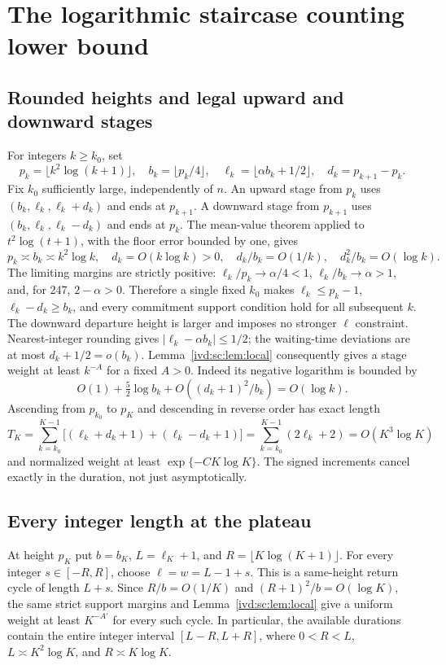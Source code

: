 \documentclass[11pt,letterpaper]{article}
\theoremstyle{remark}\newtheorem{remark}[theorem]{Remark}
\numberwithin{equation}{section}
\begin{document}
\section{The logarithmic staircase counting lower bound}\label{ivd:sc:sec:staircase}
\subsection{Rounded heights and legal upward and downward stages}
For integers $k\ge k_0$, set
\begin{equation}\label{ivd:sc:eq:stairs}
 p_k=\lfloor k^2\log(k+1)\rfloor,\quad
 b_k=\lfloor p_k/4\rfloor,\quad
 \ell_k=\lfloor\alpha b_k+1/2\rfloor,\quad d_k=p_{k+1}-p_k.
\end{equation}
Fix $k_0$ sufficiently large, independently of $n$. An upward stage
from $p_k$ uses $(b_k,\ell_k,\ell_k+d_k)$ and ends at $p_{k+1}$.
A downward stage from $p_{k+1}$ uses
$(b_k,\ell_k,\ell_k-d_k)$ and ends at $p_k$.
The mean-value theorem applied to $t^2\log(t+1)$, with the floor
error bounded by one, gives
\[
 p_k\asymp b_k\asymp k^2\log k,\quad
 d_k=O(k\log k)>0,\quad
 d_k/b_k=O(1/k),\quad d_k^2/b_k=O(\log k).
\]
The limiting margins are strictly positive:
$\ell_k/p_k\to\alpha/4<1$, $\ell_k/b_k\to\alpha>1$,
and, for 247, $2-\alpha>0$. Therefore a single fixed $k_0$ makes
$\ell_k\le p_k-1$, $\ell_k-d_k\ge b_k$, and every commitment
support condition hold for all subsequent $k$. The downward departure
height is larger and imposes no stronger $\ell$ constraint.
Nearest-integer rounding gives $|\ell_k-\alpha b_k|\le1/2$;
the waiting-time deviations are at most $d_k+1/2=o(b_k)$.
Lemma~\ref{ivd:sc:lem:local} consequently gives a stage weight at least $k^{-A}$
for a fixed $A>0$. Indeed its negative logarithm is bounded by
\[
 O(1)+\tfrac52\log b_k+O((d_k+1)^2/b_k)=O(\log k).
\]
Ascending from $p_{k_0}$ to $p_K$ and descending in reverse order has
exact length
\begin{equation}\label{ivd:sc:eq:TK}
 T_K=\sum_{k=k_0}^{K-1}\big[(\ell_k+d_k+1)+(\ell_k-d_k+1)\big]
 =\sum_{k=k_0}^{K-1}(2\ell_k+2)=O(K^3\log K)
\end{equation}
and normalized weight at least $\exp\{-C K\log K\}$. The signed
increments cancel exactly in the duration, not just asymptotically.

\subsection{Every integer length at the plateau}
At height $p_K$ put $b=b_K$, $L=\ell_K+1$, and
$R=\lfloor K\log(K+1)\rfloor$. For every integer $s\in[-R,R]$,
choose $\ell=w=L-1+s$. This is a same-height return cycle of length
$L+s$. Since $R/b=O(1/K)$ and $(R+1)^2/b=O(\log K)$, the same
strict support margins and Lemma~\ref{ivd:sc:lem:local} give a uniform
weight at least $K^{-A'}$ for every such cycle. In particular, the
available durations contain the entire integer interval $[L-R,L+R]$,
where $0<R<L$, $L\asymp K^2\log K$, and $R\asymp K\log K$.
\end{document}
